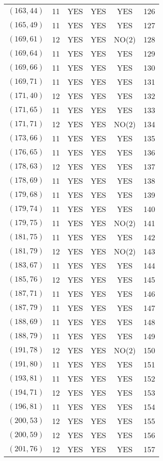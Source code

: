 \begin{longtable}{|c|c|c|c|c|c|}
$(163, 44)$ & 11 & YES & YES & YES & 126\\
$(165, 49)$ & 11 & YES & YES & YES & 127\\
$(169, 61)$ & 12 & YES & YES & NO(2) & 128\\
$(169, 64)$ & 11 & YES & YES & YES & 129\\
$(169, 66)$ & 11 & YES & YES & YES & 130\\
$(169, 71)$ & 11 & YES & YES & YES & 131\\
$(171, 40)$ & 12 & YES & YES & YES & 132\\
$(171, 65)$ & 11 & YES & YES & YES & 133\\
$(171, 71)$ & 12 & YES & YES & NO(2) & 134\\
$(173, 66)$ & 11 & YES & YES & YES & 135\\
$(176, 65)$ & 11 & YES & YES & YES & 136\\
$(178, 63)$ & 12 & YES & YES & YES & 137\\
$(178, 69)$ & 11 & YES & YES & YES & 138\\
$(179, 68)$ & 11 & YES & YES & YES & 139\\
$(179, 74)$ & 11 & YES & YES & YES & 140\\
$(179, 75)$ & 11 & YES & YES & NO(2) & 141\\
$(181, 75)$ & 11 & YES & YES & YES & 142\\
$(181, 79)$ & 12 & YES & YES & NO(2) & 143\\
$(183, 67)$ & 11 & YES & YES & YES & 144\\
$(185, 76)$ & 12 & YES & YES & YES & 145\\
$(187, 71)$ & 11 & YES & YES & YES & 146\\
$(187, 79)$ & 11 & YES & YES & YES & 147\\
$(188, 69)$ & 11 & YES & YES & YES & 148\\
$(188, 79)$ & 11 & YES & YES & YES & 149\\
$(191, 78)$ & 12 & YES & YES & NO(2) & 150\\
$(191, 80)$ & 11 & YES & YES & YES & 151\\
$(193, 81)$ & 11 & YES & YES & YES & 152\\
$(194, 71)$ & 12 & YES & YES & YES & 153\\
$(196, 81)$ & 11 & YES & YES & YES & 154\\
$(200, 53)$ & 12 & YES & YES & YES & 155\\
$(200, 59)$ & 12 & YES & YES & YES & 156\\
$(201, 76)$ & 12 & YES & YES & YES & 157\\

\end{longtable}
